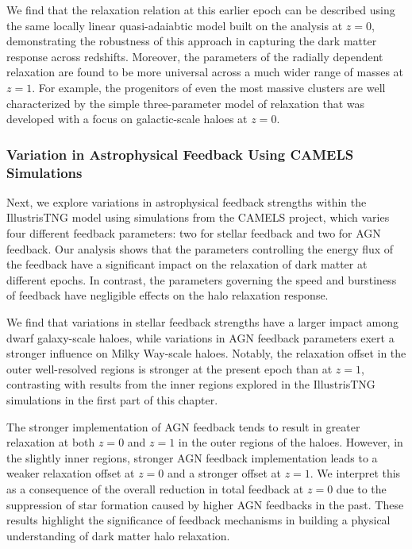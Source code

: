 We find that the relaxation relation at this earlier epoch can be described using the same locally linear quasi-adaiabtic model built on the analysis at \(z=0\), demonstrating the robustness of this approach in capturing the dark matter response across redshifts. Moreover, the parameters of the radially dependent relaxation are found to be more universal across a much wider range of masses at \( z=1 \). For example, the progenitors of even the most massive clusters are well characterized by the simple three-parameter model of relaxation that was developed with a focus on galactic-scale haloes at \( z=0 \).

\subsubsection*{Variation in Astrophysical Feedback Using CAMELS Simulations}
Next, we explore variations in astrophysical feedback strengths within the IllustrisTNG model using simulations from the CAMELS project, which varies four different feedback parameters: two for stellar feedback and two for AGN feedback. Our analysis shows that the parameters controlling the energy flux of the feedback have a significant impact on the relaxation of dark matter at different epochs. In contrast, the parameters governing the speed and burstiness of feedback have negligible effects on the halo relaxation response.

We find that variations in stellar feedback strengths have a larger impact among dwarf galaxy-scale haloes, while variations in AGN feedback parameters exert a stronger influence on Milky Way-scale haloes. Notably, the relaxation offset in the outer well-resolved regions is stronger at the present epoch than at \( z=1 \), contrasting with results from the inner regions explored in the IllustrisTNG simulations in the first part of this chapter.

The stronger implementation of AGN feedback tends to result in greater relaxation at both \( z=0 \) and \( z=1 \) in the outer regions of the haloes. However, in the slightly inner regions, stronger AGN feedback implementation leads to a weaker relaxation offset at \( z=0 \) and a stronger offset at \( z=1 \). We interpret this as a consequence of the overall reduction in total feedback at \( z=0 \) due to the suppression of star formation caused by higher AGN feedbacks in the past. These results highlight the significance of feedback mechanisms in building a physical understanding of dark matter halo relaxation.

